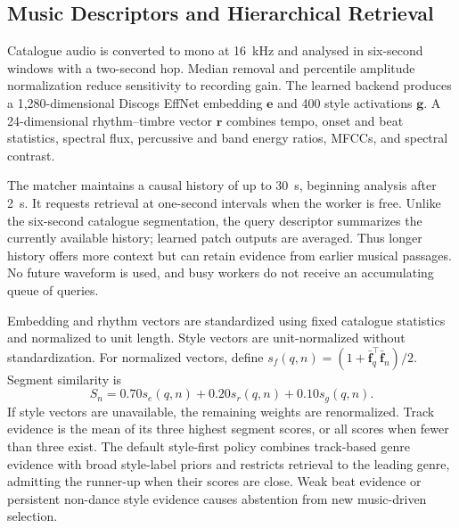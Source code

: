 \documentclass[conference]{IEEEtran}
\newcommand{\vect}[1]{\boldsymbol{#1}}
\begin{document}
\subsection{Music Descriptors and Hierarchical Retrieval}
Catalogue audio is converted to mono at 16~kHz and analysed in six-second
windows with a two-second hop. Median removal and percentile amplitude
normalization reduce sensitivity to recording gain. The learned backend
produces a 1,280-dimensional Discogs EffNet embedding $\vect{e}$ and 400 style
activations $\vect{g}$. A 24-dimensional rhythm--timbre vector $\vect{r}$
combines tempo, onset and beat statistics, spectral flux, percussive and band
energy ratios, MFCCs, and spectral contrast.

The matcher maintains a causal history of up to 30~s, beginning analysis after
2~s. It requests retrieval at one-second intervals when the worker is free.
Unlike the six-second catalogue segmentation, the query descriptor summarizes
the currently available history; learned patch outputs are averaged. Thus
longer history offers more context but can retain evidence from earlier
musical passages. No future waveform is used, and busy workers do not receive
an accumulating queue of queries.

Embedding and rhythm vectors are standardized using fixed catalogue statistics
and normalized to unit length. Style vectors are unit-normalized without
standardization. For normalized vectors, define
$s_f(q,n)=(1+\bar{\vect{f}}_q^\top\bar{\vect{f}}_n)/2$.
Segment similarity is
\begin{equation}
S_n=0.70s_e(q,n)+0.20s_r(q,n)+0.10s_g(q,n).
\end{equation}
If style vectors are unavailable, the remaining weights are renormalized.
Track evidence is the mean of its three highest segment scores, or all scores
when fewer than three exist. The default style-first policy combines
track-based genre evidence with broad style-label priors and restricts
retrieval to the leading genre, admitting the runner-up when their scores are
close. Weak beat evidence or persistent non-dance style evidence causes
abstention from new music-driven selection.
\end{document}
